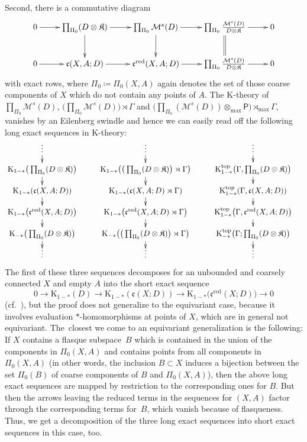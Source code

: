 \documentclass[pdftex]{sigma}
\numberwithin{equation}{section}
\theoremstyle{definition}
\newcommand{\maxtensor}{\mathbin{{\otimes}_{\mathrm{max}}}}
\newcommand{\maxcrossed}{\mathbin{{\rtimes}_{\mathrm{max}}}}
\newcommand{\K}{\mathrm{K}}
\newcommand{\Ktop}{\mathrm{K}^{\mathrm{top}}}
\newcommand{\sHigCor}{\mathfrak{c}}
\newcommand{\sHigCorRed}{\mathfrak{c}^{\mathrm{red}}}
\newcommand{\Kom}{{\mathfrak{K}}}
\newcommand{\multiplier}{{\mathcal{M}}}
\newcommand{\sfP}{\mathsf{P}}
\newcommand{\coarsecomp}{\Pi_0}
\newcommand{\myvdots}{{\vphantom{(}\raisebox{-0.3ex}[0pt][0pt]{\vdots}}}
\begin{document}
Second, there is a commutative diagram
\[
\xymatrix{
0\ar[r]& \prod_{\coarsecomp}(D\otimes\Kom)\ar[r]\ar[d]&\prod_{\coarsecomp} \multiplier^s(D)\ar[r]\ar[d]&\prod_{\coarsecomp}\frac{\multiplier^s(D)}{D\otimes\Kom}\ar[r]\ar@{=}[d]&0
\\0\ar[r]& \sHigCor(X,A;D)\ar[r]& \sHigCorRed(X,A;D)\ar[r]& \prod_{\coarsecomp}\frac{\multiplier^s(D)}{D\otimes\Kom}\ar[r]& 0
}
\]
with exact rows, where $\coarsecomp\coloneqq\coarsecomp(X,A)$ again denotes the set of those coarse components of $X$ which do not contain any points of $A$. The $\K$-theory of $\prod_{\coarsecomp}\multiplier^s(D)$, $\bigl(\prod_{\coarsecomp}\multiplier^s(D)\bigr)\rtimes\Gamma$ and $\bigl(\prod_{\coarsecomp}(\multiplier^s(D))\maxtensor\sfP\bigr)\maxcrossed\Gamma$, vanishes by an Eilenberg swindle and hence we can easily read off the following long exact sequences in $\K$-theory:
\begin{equation}\label{eq:reducedunreducedLES}
\begin{split}
&\xymatrix@R=2ex{
\myvdots\ar[d]\restore&\myvdots\ar[d]&\myvdots\ar[d]
\\
\K_{1-*}\big(\prod_{\coarsecomp}(D\otimes\Kom)\big)\ar[d]&\K_{1-*}\big(\big(\prod_{\coarsecomp}(D\otimes\Kom)\big) \rtimes\Gamma\big)\ar[d]&\Ktop_{1-*}\big(\Gamma,\prod_{\coarsecomp}(D\otimes\Kom)\big)\ar[d]
\\
\K_{1-*}(\sHigCor(X,A;D))\ar[d]&\K_{1-*}(\sHigCor(X,A;D)\rtimes\Gamma)\ar[d]&\Ktop_{1-*} (\Gamma,\sHigCor(X,A;D))\ar[d]
\\
\K_{1-*}\big(\sHigCorRed(X,A;D)\big)\ar[d]&\K_{1-*}\big(\sHigCorRed(X,A;D)\rtimes\Gamma\big)\ar[d] &\Ktop_{1-*}\big(\Gamma,\sHigCorRed(X,A;D)\big)\ar[d]
\\
\K_{-*}\big(\prod_{\coarsecomp}(D\otimes\Kom)\big)\ar[d]&\K_{-*} \big(\big(\prod_{\coarsecomp}(D\otimes\Kom)\big)\rtimes\Gamma\big)\ar[d]&\Ktop_{-*}\big(\Gamma;\prod_{\coarsecomp} (D\otimes\Kom)\big)\ar[d]
\\
\myvdots&\myvdots&\myvdots
}\end{split}\end{equation}
The first of these three sequences decomposes for an unbounded and coarsely connected $X$ and empty $A$ into the short exact sequence
\[
0\to\K_{1-*}(D)\to\K_{1-*}(\sHigCor(X;D))\to\K_{1-*}\big(\sHigCorRed(X;D)\big)\to 0
\]
(cf.\ \cite[Lemma~3.10]{EmeMeyDualizing}), but the proof does not generalize to the equivariant case, because it involves evaluation $*$-homomorphisms at points of $X$, which are in general not equivariant.
The~closest we come to an equivariant generalization is the following: If $X$ contains a flasque subspace~$B$ which is contained in the union of the components in $\coarsecomp(X,A)$ and contains points from all components in $\coarsecomp(X,A)$ (in other words, the inclusion $B\subset X$ induces a bijection between the set $\coarsecomp(B)$ of coarse components of $B$ and $\coarsecomp(X,A)$), then the above long exact sequences are mapped by restriction to the corresponding ones for $B$. But then the arrows leaving the reduced terms in the sequences for $(X,A)$ factor through the corresponding terms for~$B$, which vanish because of flasqueness. Thus, we get a decomposition of the three long exact sequences into short exact sequences in this case, too.
\end{document}
